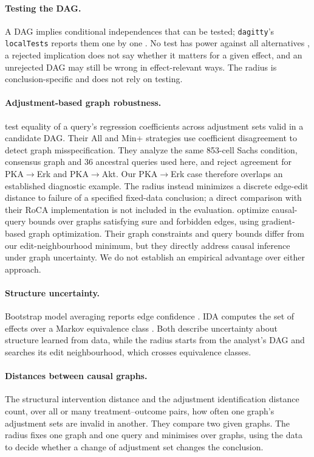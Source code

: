 \documentclass[11pt]{article}
\begin{document}
\paragraph{Testing the DAG.} A DAG implies conditional independences that can be tested; \texttt{dagitty}'s \texttt{localTests} reports them one by one \citep{textor2017,ankan2021}. No test has power against all alternatives \citep{shah2020}, a rejected implication does not say whether it matters for a given effect, and an unrejected DAG may still be wrong in effect-relevant ways. The radius is conclusion-specific and does not rely on testing.

\paragraph{Adjustment-based graph robustness.} \citet{su2022} test equality of a query's regression coefficients across adjustment sets valid in a candidate DAG. Their All and Min+ strategies use coefficient disagreement to detect graph misspecification. They analyze the same 853-cell Sachs condition, consensus graph and 36 ancestral queries used here, and reject agreement for PKA$\to$Erk and PKA$\to$Akt. Our PKA$\to$Erk case therefore overlaps an established diagnostic example. The radius instead minimizes a discrete edge-edit distance to failure of a specified fixed-data conclusion; a direct comparison with their RoCA implementation is not included in the evaluation. \citet{padh2025} optimize causal-query bounds over graphs satisfying sure and forbidden edges, using gradient-based graph optimization. Their graph constraints and query bounds differ from our edit-neighbourhood minimum, but they directly address causal inference under graph uncertainty. We do not establish an empirical advantage over either approach.

\paragraph{Structure uncertainty.} Bootstrap model averaging reports edge confidence \citep{friedman1999,scutari2010}. IDA computes the set of effects over a Markov equivalence class \citep{maathuis2009}. Both describe uncertainty about structure learned from data, while the radius starts from the analyst's DAG and searches its edit neighbourhood, which crosses equivalence classes.

\paragraph{Distances between causal graphs.} The structural intervention distance \citep{peters2015} and the adjustment identification distance \citep{henckel2024} count, over all or many treatment--outcome pairs, how often one graph's adjustment sets are invalid in another. They compare two given graphs. The radius fixes one graph and one query and minimises over graphs, using the data to decide whether a change of adjustment set changes the conclusion.
\end{document}
